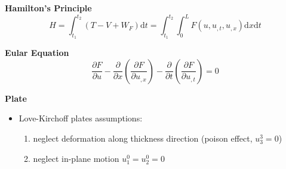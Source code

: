 \documentclass{article}
\begin{document}
\begin{multicols*}{2}
  \noindent\textbf{Hamilton's Principle}
  \begin{equation*}
    H=\int_{t_{1}}^{t_{2}}(T-V+W_{F})\text{d}t
    =\int_{t_{1}}^{t_{2}}\int_{0}^{L}F(u,u_{,t},u_{,x})\text{d}x\text{d}t
  \end{equation*}

  \noindent\textbf{Eular Equation}
  \begin{equation*}
    \frac{\partial F}{\partial u}-\frac{\partial}{\partial x}(\frac{\partial F}{\partial u_{,x}})-\frac{\partial}{\partial t}(\frac{\partial F}{\partial u_{,t}})=0
  \end{equation*}

  \noindent\textbf{Plate}
  \begin{itemize}
  \item Love-Kirchoff plates assumptions:
    \begin{enumerate}
    \item neglect deformation along thickness direction (poison effect, $u_3^3=0$)
    \item neglect in-plane motion $u_1^0=u_2^0=0$
    \end{enumerate}
  \end{itemize}





\end{multicols*}
\end{document}
